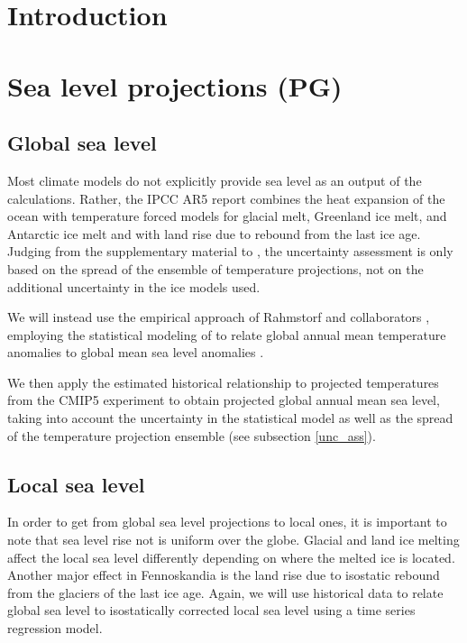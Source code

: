 \documentclass[wrr, draft]{agutex}
\begin{document}
\begin{article}



\section{Introduction}\label{sec:intro}

\section{Sea level projections {\color{blue} (PG)}}



\subsection{Global sea level}
Most climate models do not explicitly provide sea level as an output of the calculations. Rather, the IPCC AR5 report \citep[ch.~13]{ipcc} combines the heat expansion of the ocean with temperature forced models for glacial melt, Greenland ice melt, and Antarctic ice melt and with land rise due to rebound from the last ice age. Judging from the supplementary material to \citet[ch.~13]{ipcc}, the uncertainty assessment is only based on the spread of the ensemble of temperature projections, not on the additional uncertainty in the ice models used.

We will instead use the empirical approach of Rahmstorf and collaborators \citep{Rahmstorf07,Rahmstorf11}, employing the statistical modeling of \citet{Bolin2014a} to relate global annual mean temperature anomalies \citep{giss} to global mean sea level anomalies \citep{csiro}. 


We then apply the estimated historical relationship to projected temperatures from the CMIP5 experiment \citep{cmip5} to obtain projected global annual mean sea level, taking into account the uncertainty in the statistical model as well as the spread of the temperature projection ensemble (see subsection \ref{unc_ass}). 


\subsection{Local sea level}
In order to get from global sea level projections to local ones, it is important to note that sea level rise not is uniform over the globe. Glacial and land ice melting affect the local sea level differently depending on where the melted ice is located.
Another major effect in Fennoskandia is the land rise due to isostatic rebound from the glaciers of the last ice age. 
Again, we will use historical data to relate global sea level to isostatically corrected local sea level using a time series regression model. 


\end{article}
\end{document}
